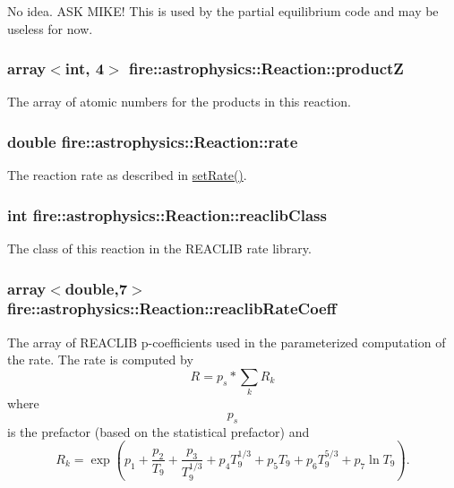 No idea. A\+SK M\+I\+K\+E! This is used by the partial equilibrium code and may be useless for now. 
\subsubsection[{\texorpdfstring{productZ}{productZ}}]{\setlength{\rightskip}{0pt plus 5cm}array$<$int, 4$>$ fire\+::astrophysics\+::\+Reaction\+::productZ}\hypertarget{a00022_a0586d888e1f60d6371239af888f9158b}{}\label{a00022_a0586d888e1f60d6371239af888f9158b}
The array of atomic numbers for the products in this reaction. 
\subsubsection[{\texorpdfstring{rate}{rate}}]{\setlength{\rightskip}{0pt plus 5cm}double fire\+::astrophysics\+::\+Reaction\+::rate}\hypertarget{a00022_a343553d449e3cca261f8ee166fa6b699}{}\label{a00022_a343553d449e3cca261f8ee166fa6b699}
The reaction rate as described in \hyperlink{a00022_a671a0560e6843664cdae4d724b8645da}{set\+Rate()}. 
\subsubsection[{\texorpdfstring{reaclib\+Class}{reaclibClass}}]{\setlength{\rightskip}{0pt plus 5cm}int fire\+::astrophysics\+::\+Reaction\+::reaclib\+Class}\hypertarget{a00022_a581b5410f62a299f2262324d6c0199c7}{}\label{a00022_a581b5410f62a299f2262324d6c0199c7}
The class of this reaction in the R\+E\+A\+C\+L\+IB rate library. 
\subsubsection[{\texorpdfstring{reaclib\+Rate\+Coeff}{reaclibRateCoeff}}]{\setlength{\rightskip}{0pt plus 5cm}array$<$double,7$>$ fire\+::astrophysics\+::\+Reaction\+::reaclib\+Rate\+Coeff}\hypertarget{a00022_aa6265e73f4d2c55441caf95e6eb6e656}{}\label{a00022_aa6265e73f4d2c55441caf95e6eb6e656}
The array of R\+E\+A\+C\+L\+IB p-\/coefficients used in the parameterized computation of the rate. The rate is computed by \[ R = p_s*\sum_k R_k \] where \[p_s\] is the prefactor (based on the statistical prefactor) and \[ R_k = \exp(p_1 + \frac{p_2}{T_9} + \frac{p_3}{T_9^{1/3}} + p_{4}T_9^{1/3} + p_{5}T_9 + p_{6}T_9^{5/3} + p_{7}\ln T_9). \]

